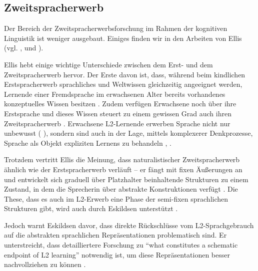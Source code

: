 
\subsection{Zweitspracherwerb}
Der Bereich der Zweitspracherwerbsforschung im Rahmen der kognitiven Linguistik ist weniger ausgebaut.
Einiges finden wir in den Arbeiten von Ellis (vgl. \cite{Ellis04}, \cite{Ellis06} und \cite{Ellis08}).

Ellis hebt einige wichtige Unterschiede zwischen dem Erst- und dem Zweitspracherwerb hervor.
Der Erste davon ist, dass, während beim kindlichen Erstspracherwerb sprachliches und Weltwissen gleichzeitig angeeignet werden, Lernende einer Fremdsprache im erwachsenen Alter bereits vorhandenes konzeptuelles Wissen besitzen \cite[S.72]{Ellis08}.
Zudem verfügen Erwachsene noch über ihre Erstsprache und dieses Wissen steuert zu einem gewissen Grad auch ihren Zweitspracherwerb \cite[S.72]{Ellis08}.
Erwachsene L2-Lernende erwerben Sprache nicht nur unbewusst ( \cite[``implizit'', vgl.][S.63 ff.]{Ellis04}), sondern sind auch in der Lage, mittels komplexerer Denkprozesse, Sprache als Objekt expliziten Lernens zu behandeln \cite[S.72]{Ellis08}, \cite[S.65]{Ellis04}.

Trotzdem vertritt Ellis die Meinung, dass naturalistischer Zweitspracherwerb ähnlich wie der Erstspracherwerb verläuft --
er fängt mit fixen Äußerungen an und entwickelt sich graduell über Platzhalter beinhaltende Strukturen zu einem Zustand, in dem die Sprecherin über abstrakte Konstruktionen verfügt \cite[vgl.][S.74]{Ellis08}.
Die These, dass es auch im L2-Erwerb eine Phase der semi-fixen sprachlichen Strukturen gibt, wird auch durch Eskildsen unterstützt \cite[S.338]{Eskildsen08}.

Jedoch warnt Eskildsen davor, dass direkte Rückschlüsse vom L2-Sprachgebrauch auf die abstrakten sprachlichen Repräsentationen problematisch sind.
Er unterstreicht, dass detailliertere Forschung zu ``what constitutes a schematic endpoint of L2 learning'' notwendig ist, um diese Repräsentationen besser nachvollziehen zu können \cite[S.353]{Eskildsen08}.


